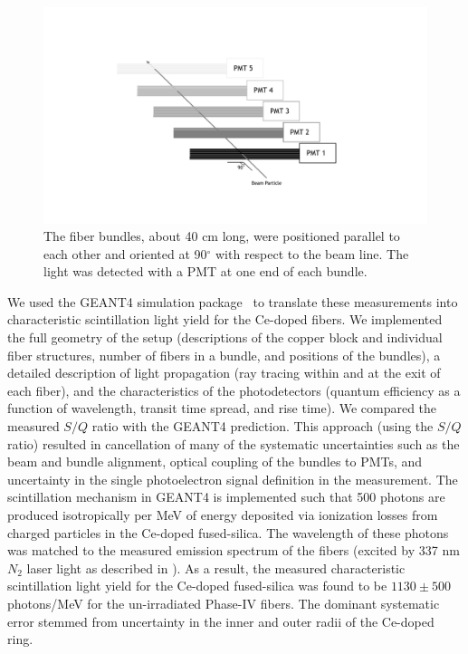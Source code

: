 \documentclass[a4paper,11pt]{article}
\begin{document}
\begin{figure}[ht]
\begin{center}\vspace{-1pc}
      \includegraphics[width=15cm]{Figures/FiberBundles.pdf}
\caption{\small The fiber bundles, about 40 cm long, were positioned parallel to each other and oriented at 90$^\circ$ with respect to the beam line. The light was detected with a PMT at one end of each bundle.}
    \label{fig:bundles}
\end{center}
\end{figure}

We used the GEANT4 simulation package~\cite{r-GEANT4} to translate these measurements into characteristic scintillation light yield for the Ce-doped fibers.  We implemented the full geometry of the setup (descriptions of the copper block and individual fiber structures, number of fibers in a bundle, and positions of the bundles), a detailed description of light propagation (ray tracing within and at the exit of each fiber), and the characteristics of the photodetectors (quantum efficiency as a function of wavelength, transit time spread, and rise time).  We compared the measured $S/Q$ ratio with the GEANT4 prediction.  This approach (using the $S/Q$ ratio) resulted in cancellation of many of the systematic uncertainties such as the beam and bundle alignment, optical coupling of the bundles to PMTs, and uncertainty in the single photoelectron signal definition in the measurement.  The scintillation mechanism in GEANT4 is implemented such that 500 photons are produced isotropically per MeV of energy deposited via ionization losses from charged particles in the Ce-doped fused-silica. The wavelength of these photons was  matched to the measured emission spectrum of the fibers (excited by 337 nm $N_2$ laser light as described in \cite{JINSTPaper2}).  As a result, the measured characteristic scintillation light yield for the Ce-doped fused-silica was found to be $1130\pm 500$ photons/MeV for the un-irradiated Phase-IV fibers. The dominant systematic error stemmed from uncertainty in the inner and outer radii of the Ce-doped ring. 
\end{document}
